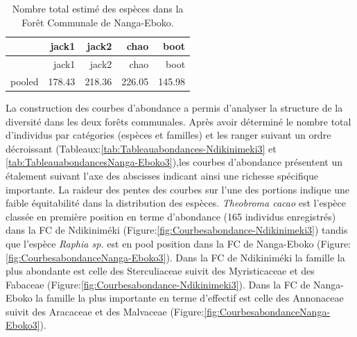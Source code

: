 \documentclass[
  12pt,
  a4paper,
  extrafontsizes,
  onecolumn,
  openright]{book}
\theoremstyle{definition}
\theoremstyle{definition}
\theoremstyle{definition}
\theoremstyle{definition}
\theoremstyle{remark}
\begin{document}
\begin{longtable}[]{@{}lrrrr@{}}
\caption{\label{tab:EstimationespecesNanga-Eboko3}Nombre total estimé des espèces dans la Forêt Communale de Nanga-Eboko.}\tabularnewline
\toprule()
& jack1 & jack2 & chao & boot \\
\midrule()
\endfirsthead
\toprule()
& jack1 & jack2 & chao & boot \\
\midrule()
\endhead
pooled & 178.43 & 218.36 & 226.05 & 145.98 \\
\bottomrule()
\end{longtable}

La construction des courbes d'abondance a permis d'analyser la structure de la diversité dans les deux forêts communales. Après avoir déterminé le nombre total d'individus par catégories (espèces et familles) et les ranger suivant un ordre décroissant (Tableaux:\ref{tab:Tableauabondances-Ndikinimeki3} et \ref{tab:TableauabondancesNanga-Eboko3}),les courbes d'abondance présentent un étalement suivant l'axe des abscisses indicant ainsi une richesse spécifique importante. La raideur des pentes des courbes sur l'une des portions indique une faible équitabilité dans la distribution des espèces. \emph{Theobroma cacao} est l'espèce classée en première position en terme d'abondance (165 individus enregistrés) dans la FC de Ndikiniméki (Figure:\ref{fig:Courbesabondance-Ndikinimeki3}) tandis que l'espèce \emph{Raphia sp.} est en pool position dans la FC de Nanga-Eboko (Figure:\ref{fig:CourbesabondanceNanga-Eboko3}). Dans la FC de Ndikiniméki la famille la plus abondante est celle des Sterculiaceae suivit des Myristicaceae et des Fabaceae (Figure:\ref{fig:Courbesabondance-Ndikinimeki3}). Dans la FC de Nanga-Eboko la famille la plus importante en terme d'effectif est celle des Annonaceae suivit des Aracaceae et des Malvaceae (Figure:\ref{fig:CourbesabondanceNanga-Eboko3}).
\end{document}
